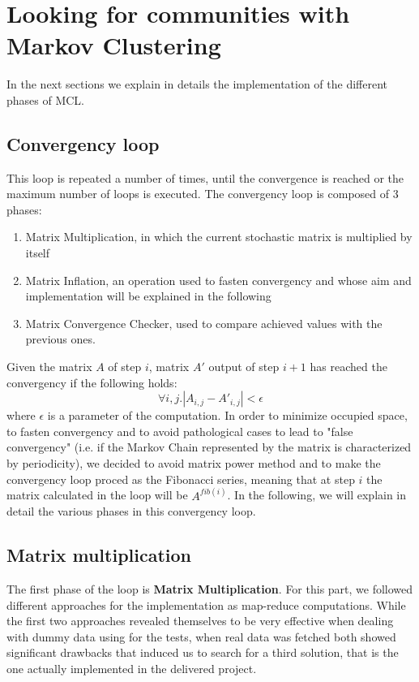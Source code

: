\section{Looking for communities with Markov Clustering}
\label{mcl}

In the next sections we explain in details the implementation of the
different phases of MCL.

\subsection{Convergency loop}
This loop is repeated a number of times, until the convergence is reached or the maximum
number of loops is executed.
The convergency loop is composed of 3 phases:
\begin{enumerate}
\item Matrix Multiplication, in which the current stochastic matrix is multiplied by itself
\item Matrix Inflation, an operation used to fasten convergency and whose aim and implementation will be explained in the following
\item Matrix Convergence Checker, used to compare achieved values with the previous ones.
\end{enumerate}

Given the matrix $A$ of step $i$, matrix $A'$ output of step $i+1$ has reached the convergency
if the following holds:
$$
\forall i,j . |A_{i,j} - A'_{i,j}| < \epsilon
$$ 
where $\epsilon$ is a parameter of the computation.
In order to minimize occupied space, to fasten convergency and to avoid pathological
cases to lead to "false convergency" (i.e. if the Markov Chain represented by the
matrix is characterized by periodicity), we decided to avoid matrix power method 
and to make the convergency loop proced as the Fibonacci series, meaning
that at step $i$ the matrix calculated in the loop will be $A^{fib(i)}$.
In the following, we will explain in detail the various phases in this convergency
loop.

\subsection{Matrix multiplication}
The first phase of the loop is \textbf{Matrix Multiplication}. For this part, we followed different
approaches for the implementation as map-reduce computations. While the first two approaches
revealed themselves to be very effective when dealing with dummy data using for the tests,
when real data was fetched both showed significant drawbacks that induced us to search for
a third solution, that is the one actually implemented in the delivered project.

